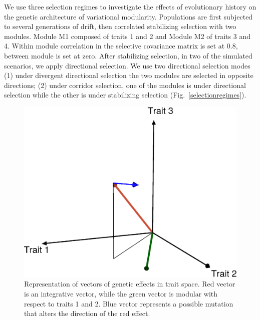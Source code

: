 \begin{refsection}
We use three selection regimes to investigate the effects of evolutionary
history on the genetic architecture of variational modularity. Populations are
first subjected to several generations of drift, then correlated stabilizing
selection with two modules. Module M1 composed of traits 1 and 2 and Module M2
of traits 3 and 4. Within module correlation in the selective covariance matrix
is set at 0.8, between module is set at zero. After stabilizing selection, in
two of the simulated scenarios, we apply directional selection. We use two
directional selection modes (1) under divergent directional selection the two
modules are selected in opposite directions; (2) under corridor selection, one of
the modules is under directional selection while the other is under stabilizing
selection (Fig.~\ref{selectionregimes}).

\begin{figure}
    \centering
    \includegraphics[width=\linewidth]{chapter_atchley/media/plot.eps}
    \caption[Pleiotropic effect in trait space]{Representation of vectors of genetic effects in trait space. Red vector is an integrative vector, while the green vector is modular with respect to traits 1 and 2. Blue vector represents a possible mutation that alters the direction of the red effect.}
    \label{effectvectors}
\end{figure}


\end{refsection}
